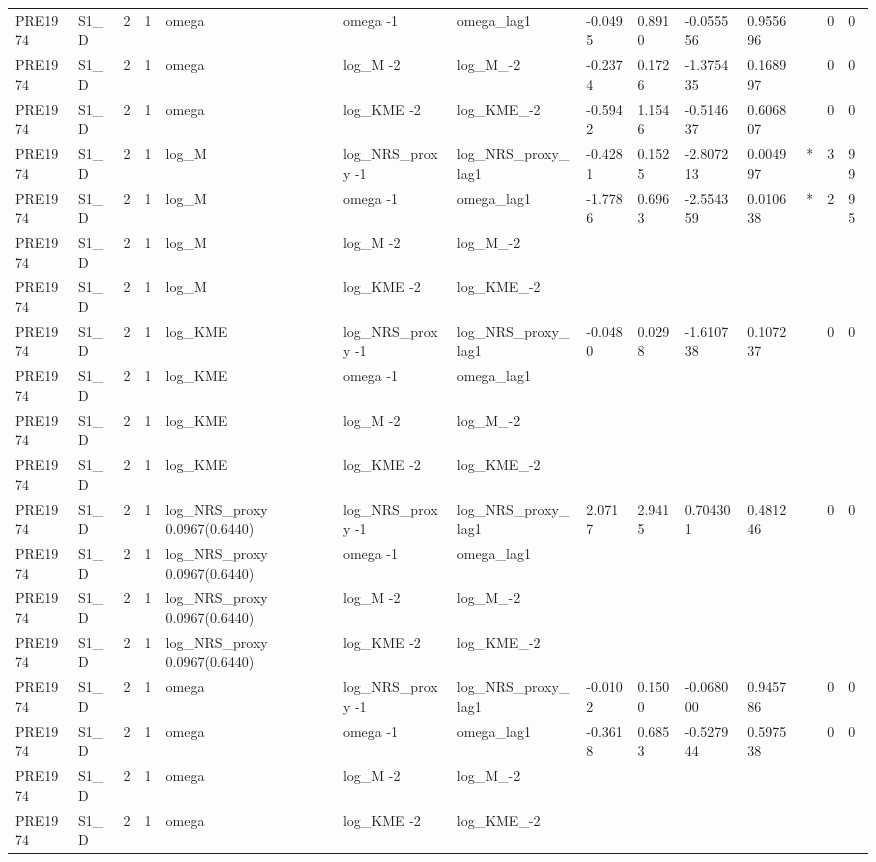 \begin{tabular}{llllllllllllll}
PRE1974 & S1\_D & 2 & 1 & omega & omega -1 & omega\_lag1 & -0.0495 & 0.8910 & -0.055556 & 0.955696 &  & 0 & 0 \\
PRE1974 & S1\_D & 2 & 1 & omega & log\_M -2 & log\_M\_-2 & -0.2374 & 0.1726 & -1.375435 & 0.168997 &  & 0 & 0 \\
PRE1974 & S1\_D & 2 & 1 & omega & log\_KME -2 & log\_KME\_-2 & -0.5942 & 1.1546 & -0.514637 & 0.606807 &  & 0 & 0 \\
PRE1974 & S1\_D & 2 & 1 & log\_M & log\_NRS\_proxy -1 & log\_NRS\_proxy\_lag1 & -0.4281 & 0.1525 & -2.807213 & 0.004997 & * & 3 & 99 \\
PRE1974 & S1\_D & 2 & 1 & log\_M & omega -1 & omega\_lag1 & -1.7786 & 0.6963 & -2.554359 & 0.010638 & * & 2 & 95 \\
PRE1974 & S1\_D & 2 & 1 & log\_M & log\_M -2 & log\_M\_-2 &  &  &  &  &  &  &  \\
PRE1974 & S1\_D & 2 & 1 & log\_M & log\_KME -2 & log\_KME\_-2 &  &  &  &  &  &  &  \\
PRE1974 & S1\_D & 2 & 1 & log\_KME & log\_NRS\_proxy -1 & log\_NRS\_proxy\_lag1 & -0.0480 & 0.0298 & -1.610738 & 0.107237 &  & 0 & 0 \\
PRE1974 & S1\_D & 2 & 1 & log\_KME & omega -1 & omega\_lag1 &  &  &  &  &  &  &  \\
PRE1974 & S1\_D & 2 & 1 & log\_KME & log\_M -2 & log\_M\_-2 &  &  &  &  &  &  &  \\
PRE1974 & S1\_D & 2 & 1 & log\_KME & log\_KME -2 & log\_KME\_-2 &  &  &  &  &  &  &  \\
PRE1974 & S1\_D & 2 & 1 & log\_NRS\_proxy 0.0967(0.6440) & log\_NRS\_proxy -1 & log\_NRS\_proxy\_lag1 & 2.0717 & 2.9415 & 0.704301 & 0.481246 &  & 0 & 0 \\
PRE1974 & S1\_D & 2 & 1 & log\_NRS\_proxy 0.0967(0.6440) & omega -1 & omega\_lag1 &  &  &  &  &  &  &  \\
PRE1974 & S1\_D & 2 & 1 & log\_NRS\_proxy 0.0967(0.6440) & log\_M -2 & log\_M\_-2 &  &  &  &  &  &  &  \\
PRE1974 & S1\_D & 2 & 1 & log\_NRS\_proxy 0.0967(0.6440) & log\_KME -2 & log\_KME\_-2 &  &  &  &  &  &  &  \\
PRE1974 & S1\_D & 2 & 1 & omega & log\_NRS\_proxy -1 & log\_NRS\_proxy\_lag1 & -0.0102 & 0.1500 & -0.068000 & 0.945786 &  & 0 & 0 \\
PRE1974 & S1\_D & 2 & 1 & omega & omega -1 & omega\_lag1 & -0.3618 & 0.6853 & -0.527944 & 0.597538 &  & 0 & 0 \\
PRE1974 & S1\_D & 2 & 1 & omega & log\_M -2 & log\_M\_-2 &  &  &  &  &  &  &  \\
PRE1974 & S1\_D & 2 & 1 & omega & log\_KME -2 & log\_KME\_-2 &  &  &  &  &  &  &  \\
\hline
\end{tabular}
